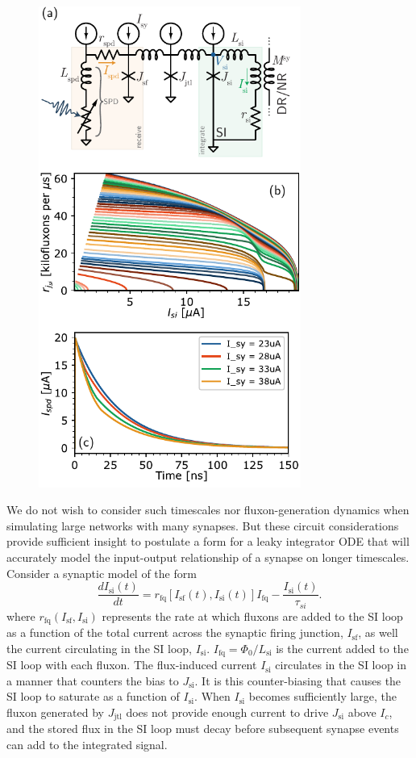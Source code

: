 \documentclass[twocolumn]{article}
\begin{document}
\begin{figure}[h!]
\includegraphics[width=8.6cm]{figures/_03__syn__circuit__rate_array.pdf}
\end{figure}
We do not wish to consider such timescales nor fluxon-generation dynamics when simulating large networks with many synapses. But these circuit considerations provide sufficient insight to postulate a form for a leaky integrator ODE that will accurately model the input-output relationship of a synapse on longer timescales. Consider a synaptic model of the form 
\begin{equation}
\label{eq:leaky_integrator__SI_loop}
\frac{dI_{\mathrm{si}}(t)}{dt} = r_{\mathrm{fq}}\left[I_{\mathrm{sf}}(t),I_{\mathrm{si}}(t)\right] I_{\mathrm{fq}}-\frac{I_{\mathrm{si}}(t)}{\tau_{si}}.
\end{equation}
where $r_{\mathrm{fq}}(I_{\mathrm{sf}},I_{\mathrm{si}})$ represents the rate at which fluxons are added to the SI loop as a function of the total current across the synaptic firing junction, $I_{\mathrm{sf}}$, as well the current circulating in the SI loop, $I_{\mathrm{si}}$. $I_{\mathrm{fq}} = \Phi_0/L_{\mathrm{si}}$ is the current added to the SI loop with each fluxon. The flux-induced current $I_{\mathrm{si}}$ circulates in the SI loop in a manner that counters the bias to $J_{\mathrm{si}}$. It is this counter-biasing that causes the SI loop to saturate as a function of $I_{\mathrm{si}}$. When $I_{\mathrm{si}}$ becomes sufficiently large, the fluxon generated by $J_{\mathrm{jtl}}$ does not provide enough current to drive $J_{\mathrm{si}}$ above $I_c$, and the stored flux in the SI loop must decay before subsequent synapse events can add to the integrated signal. 
\end{document}

